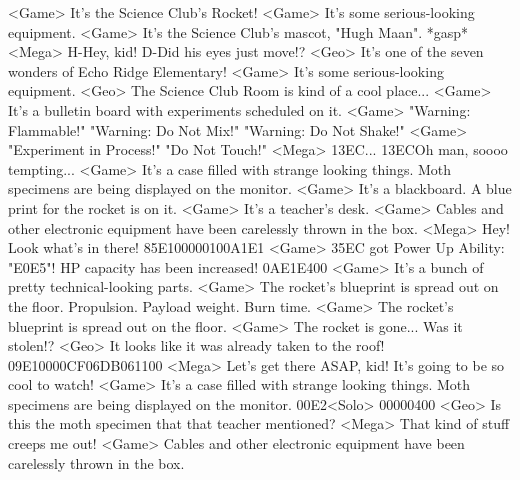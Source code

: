 <Game> It's the Science Club's Rocket! 
<Game> It's some serious-looking equipment. 
<Game> It's the Science Club's mascot, "Hugh Maan". 
*gasp* 
<Mega> H-Hey, kid! D-Did his eyes just move!? 
<Geo> It's one of the seven wonders of Echo Ridge Elementary! 
<Game> It's some serious-looking equipment. 
<Geo> The Science Club Room is kind of a cool place... 
<Game> It's a bulletin board with experiments scheduled on it. 
<Game> "Warning: Flammable!" "Warning: Do Not Mix!" "Warning: Do Not Shake!" 
<Game> "Experiment in Process!" "Do Not Touch!" 
<Mega> {13}{EC}... 
{13}{EC}Oh man, soooo tempting... 
<Game> It's a case filled with strange looking things. 
Moth specimens are being displayed on the monitor. 
<Game> It's a blackboard. 
A blue print for the rocket is on it. 
<Game> It's a teacher's desk. 
<Game> Cables and other electronic equipment have been carelessly thrown in the box. 
<Mega> Hey! Look what's in there! 
{85}{E1}{00}{00}{01}{00}{A1}{E1} 
<Game> {35}{EC} got Power Up Ability: "{E0}{E5}"! 
HP capacity has been increased! 
{0A}{E1}{E4}{00}
<Game> It's a bunch of pretty technical-looking parts. 
<Game> The rocket's blueprint is spread out on the floor. 
Propulsion. Payload weight. Burn time. 
<Game> The rocket's blueprint is spread out on the floor. 
<Game> The rocket is gone... Was it stolen!? 
<Geo> It looks like it was already taken to the roof! 
{09}{E1}{00}{00}{CF}{06}{DB}{06}{11}{00} 
<Mega> Let's get there ASAP, kid! It's going to be so cool to watch! 
<Game> It's a case filled with strange looking things. 
Moth specimens are being displayed on the monitor. 
{00}{E2}<Solo> {00}{00}{04}{00} 
<Geo> Is this the moth specimen that that teacher mentioned? 
<Mega> That kind of stuff creeps me out! 
<Game> Cables and other electronic equipment have been carelessly thrown in the box. 
